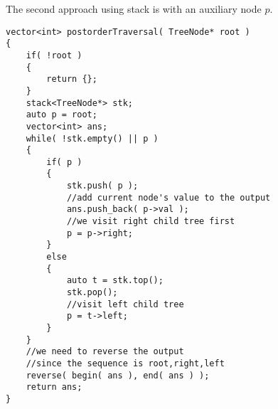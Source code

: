 The second approach using stack is with an auxiliary node $p$.

\begin{lstlisting}[style=customc, caption={Stack With Auxiliary Node}]
vector<int> postorderTraversal( TreeNode* root )
{
    if( !root )
    {
        return {};
    }
    stack<TreeNode*> stk;
    auto p = root;
    vector<int> ans;
    while( !stk.empty() || p )
    {
        if( p )
        {
            stk.push( p );
            //add current node's value to the output
            ans.push_back( p->val );
            //we visit right child tree first
            p = p->right;
        }
        else
        {
            auto t = stk.top();
            stk.pop();
            //visit left child tree
            p = t->left;
        }
    }
    //we need to reverse the output
    //since the sequence is root,right,left
    reverse( begin( ans ), end( ans ) );
    return ans;
}
\end{lstlisting} 

